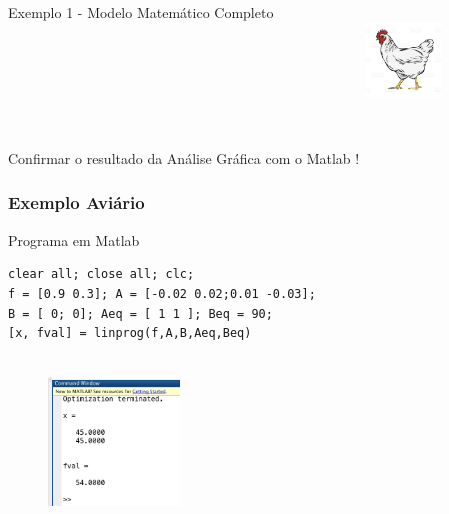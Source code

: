 \documentclass{beamer}
\begin{document}
\begin{frame}
\begin{columns}
\begin{column}{0.8\textwidth}
\begin{exampleblock}{Exemplo 1 - Modelo Matemático Completo}
{				}
			\end{exampleblock}
		\end{column}
		\begin{column}{0.2\textwidth}
			\centering
			\includegraphics[width=2cm,height=3cm]{aviario.jpg}
		\end{column}
	\end{columns}
	{
	\begin{mdframed}[backgroundcolor=blue!20]
		\Large
		Confirmar o resultado da Análise Gráfica com o Matlab !
	\end{mdframed}
	}	
\end{frame}

\begin{frame}[fragile] 
	\frametitle{Exemplo Aviário}
	\centering
	\begin{block}{Programa em Matlab}
		\begin{lstlisting}
clear all; close all; clc;
f = [0.9 0.3]; A = [-0.02 0.02;0.01 -0.03]; 
B = [ 0; 0]; Aeq = [ 1 1 ]; Beq = 90;
[x, fval] = linprog(f,A,B,Aeq,Beq)	
		\end{lstlisting}	
	\end{block}	

	\begin{figure}
		\includegraphics[width=3.5cm,height=4.5cm]{MatLabAviario.png}
	\end{figure}

\end{frame}
\end{document}
